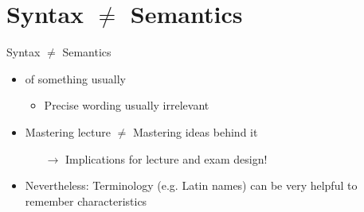 \documentclass{ercisbeamer}
\begin{document}
\section{Syntax $\ne$ Semantics}
\begin{frame}{Syntax $\ne$ Semantics}
    \begin{tbox}
        \begin{itemize}
            \item {} of something usually 
            \begin{itemize}
                \item Precise wording usually irrelevant
            \end{itemize}
            \item Mastering lecture $\ne$ Mastering ideas behind it
                \begin{itemize}
                    \item[$\rightarrow$] Implications for lecture and exam design!
                \end{itemize}
            \item Nevertheless: Terminology (e.g. Latin names) can be very helpful to remember characteristics
        \end{itemize}
    \end{tbox}
\end{frame}

\end{document}
